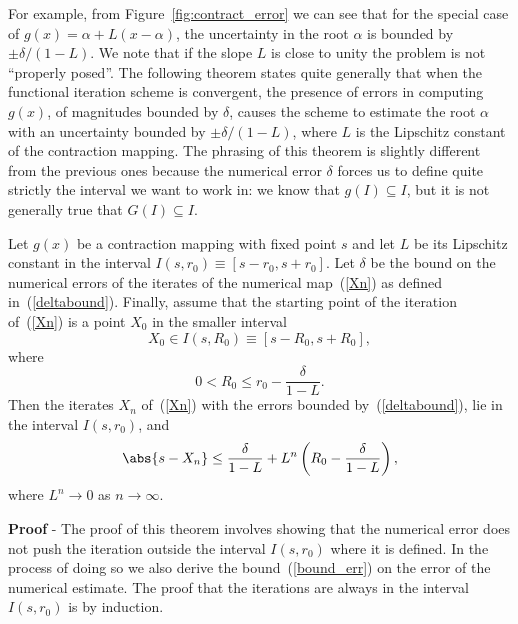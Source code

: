 For example, from Figure~\ref{fig:contract_error} we can see that for
the special case of $g(x) = \alpha + L (x-\alpha)$, the uncertainty in
the root $\alpha$ is bounded by $\pm \delta/(1 - L)$.  We note that if
the slope $L$ is close to unity the problem is not ``properly posed''.
The following theorem states quite generally that when the functional
iteration scheme is convergent, the presence of errors in computing
$g(x)$, of magnitudes bounded by $\delta$, causes the scheme to
estimate the root $\alpha$ with an uncertainty bounded by $\pm
\delta/(1-L)$, where $L$ is the Lipschitz constant of the contraction
mapping.  The phrasing of this theorem is slightly different from the
previous ones because the numerical error $\delta$ forces us to define
quite strictly the interval we want to work in: we know that $g(I)
\subseteq I$, but it is not generally true that $G(I) \subseteq I$.

\begin{theorem}
\label{contract5}
Let $g(x)$ be a contraction mapping with fixed point $s$ and let $L$
be its Lipschitz constant in the interval $I(s,r_0) \equiv
[s-r_0,s+r_0]$.  Let $\delta$ be the bound on the numerical errors of
the iterates of the numerical map~(\ref{Xn}) as defined
in~(\ref{deltabound}).  Finally, assume that the starting point of the
iteration of~(\ref{Xn}) is a point $X_0$ in the smaller interval
%
\begin{equation}
  X_0 \in I(s,R_0) \equiv [s - R_0, s + R_0] ,  \label{X0}
\end{equation}
%
where
%
\begin{equation*}
  0 < R_0 \le r_0 - \frac{\delta}{1-L} .
\end{equation*}
%
Then the iterates $X_n$ of~(\ref{Xn}) with the errors bounded
by~(\ref{deltabound}), lie in the interval $I(s,r_0)$,
and
%
\begin{equation}
  \abs{ s - X_n } \le
  \frac{\delta}{1 - L} +
  L^n \left ( R_0 - \frac{\delta}{1-L} \right ), \label{bound_err}
\end{equation}
%
where $L^n \to 0$ as $n \to \infty$.
\end{theorem}

\noindent
\textbf{Proof} - The proof of this theorem involves showing that the
numerical error does not push the iteration outside the interval
$I(s,r_0)$ where it is defined.  In the process of doing so we also
derive the bound~(\ref{bound_err}) on the error of the numerical
estimate.  The proof that the iterations are always in the interval
$I(s,r_0)$ is by induction.

